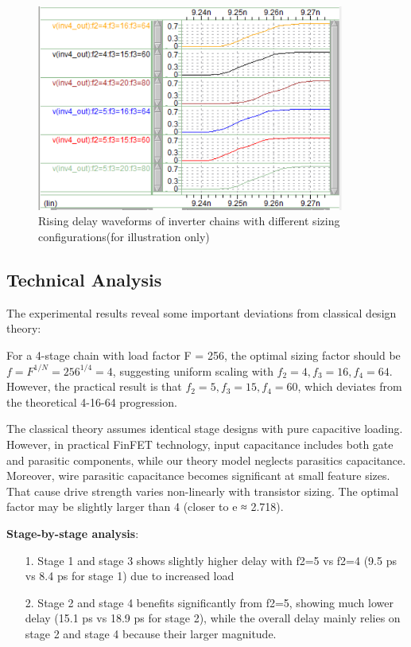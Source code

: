 \documentclass[UTF8,12pt,a4paper]{ctexart}
\begin{document}
\begin{figure}[h]
\centering
\includegraphics[width=0.9\textwidth]{任务书/image-2.png}
\caption{Rising delay waveforms of inverter chains with different sizing configurations(for illustration only)}
\label{fig:task2_waveform}
\end{figure}

\subsection{Technical Analysis}

The experimental results reveal some important deviations from classical design theory:

For a 4-stage chain with load factor F = 256, the optimal sizing factor should be $f = F^{1/N} = 256^{1/4} = 4$, suggesting uniform scaling with $f_2 = 4, f_3 = 16, f_4 = 64$. However, the practical result is that $f_2 = 5, f_3 = 15, f_4 = 60$, which deviates from the theoretical 4-16-64 progression.

The classical theory assumes identical stage designs with pure capacitive loading. However, in practical FinFET technology, input capacitance includes both gate and parasitic components, while our theory model neglects parasitics capacitance. Moreover, wire parasitic capacitance becomes significant at small feature sizes. That cause drive strength varies non-linearly with transistor sizing. The optimal factor may be slightly larger than 4 (closer to e ≈ 2.718).

\textbf{Stage-by-stage analysis}: 
\begin{itemize}
    \item[1.] Stage 1 and stage 3 shows slightly higher delay with f2=5 vs f2=4 (9.5 ps vs 8.4 ps for stage 1) due to increased load
    \item[2.] Stage 2  and stage 4 benefits significantly from f2=5, showing much lower delay (15.1 ps vs 18.9 ps for stage 2), while the overall delay mainly relies on stage 2 and stage 4 because their larger magnitude.
\end{itemize}
\end{document}
